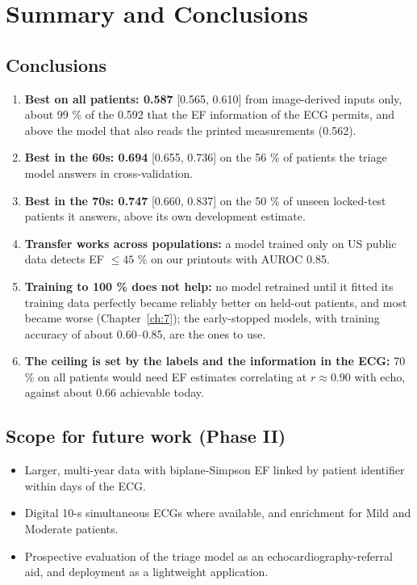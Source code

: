 \chapter{Summary and Conclusions}\label{ch:8}

\section{Conclusions}\label{sec:8.1}

\begin{enumerate}
  \item \textbf{Best on all patients: 0.587} [0.565, 0.610] from image-derived inputs only, about 99 \% of the 0.592 that the EF information of the ECG permits, and above the model that also reads the printed measurements (0.562).
  \item \textbf{Best in the 60s: 0.694} [0.655, 0.736] on the 56 \% of patients the triage model answers in cross-validation.
  \item \textbf{Best in the 70s: 0.747} [0.660, 0.837] on the 50 \% of unseen locked-test patients it answers, above its own development estimate.
  \item \textbf{Transfer works across populations:} a model trained only on US public data detects EF $\le45$ \% on our printouts with AUROC 0.85.
  \item \textbf{Training to 100 \% does not help:} no model retrained until it fitted its training data perfectly became reliably better on held-out patients, and most became worse (Chapter~\ref{ch:7}); the early-stopped models, with training accuracy of about 0.60--0.85, are the ones to use.
  \item \textbf{The ceiling is set by the labels and the information in the ECG:} 70 \% on all patients would need EF estimates correlating at $r\approx0.90$ with echo, against about 0.66 achievable today.
\end{enumerate}
\section{Scope for future work (Phase II)}\label{sec:8.2}

\begin{itemize}
  \item Larger, multi-year data with biplane-Simpson EF linked by patient identifier within days of the ECG.
  \item Digital 10-s simultaneous ECGs where available, and enrichment for Mild and Moderate patients.
  \item Prospective evaluation of the triage model as an echocardiography-referral aid, and deployment as a lightweight application.
\end{itemize}
